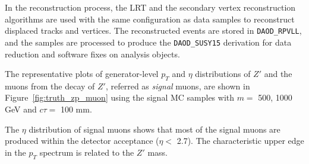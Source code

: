 In the reconstruction process, the LRT and the secondary vertex reconstruction algorithms are used with the same configuration as data samples to reconstruct displaced tracks and vertices. The reconstructed events are stored in \texttt{DAOD\_RPVLL}, and the samples are processed to produce the \texttt{DAOD\_SUSY15} derivation for data reduction and software fixes on analysis objects.

The representative plots of generator-level $p_{T}$ and $\eta$ distributions of $Z'$ and the muons from the decay of $Z'$, referred as \textit{signal} muons, are shown in Figure~\ref{fig:truth_zp_muon} using the signal MC samples with $m=$ 500, 1000 GeV and $c\tau=$ 100 mm. %

The $\eta$ distribution of signal muons shows that most of the signal muons are produced within the detector acceptance ($\eta <$ 2.7). The characteristic upper edge in the $p_{T}$ spectrum is related to the $Z'$ mass.


